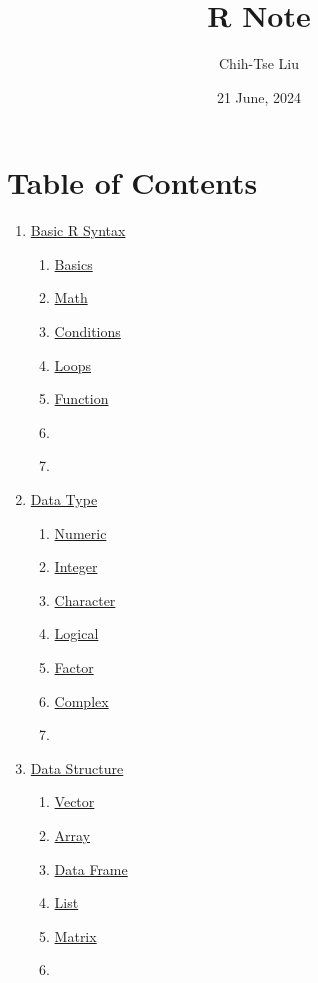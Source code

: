 \documentclass[
  12pt,
]{article}
\title{R Note}
\author{Chih-Tse Liu}
\date{21 June, 2024}
\begin{document}
\maketitle

\section{Table of Contents}
\label{sec:ToC}
\begin{enumerate}
\item \hyperref[sec:BRS]{Basic R Syntax}
  \begin{enumerate}
  \item \hyperref[sec:BRS-basics]{Basics}
  \item \hyperref[sec:BRS-math]{Math}
  \item \hyperref[sec:BRS-conditions]{Conditions}
  \item \hyperref[sec:BRS-loops]{Loops}
  \item \hyperref[sec:BRS-function]{Function}
  \item \hyperref[sec:BRS-]{}
  \item \hyperref[sec:BRS-]{}
  \end{enumerate}
\item \hyperref[sec:VAR]{Data Type}
  \begin{enumerate}
  \item \hyperref[sec:VAR-numeric]{Numeric}
  \item \hyperref[sec:VAR-integer]{Integer}
  \item \hyperref[sec:VAR-character]{Character}
  \item \hyperref[sec:VAR-logical]{Logical}
  \item \hyperref[sec:VAR-factor]{Factor}
  \item \hyperref[sec:VAR-complex]{Complex}
  \item \hyperref[sec:VAR-]{}
  \end{enumerate}
\item \hyperref[sec:DS]{Data Structure}
  \begin{enumerate}
  \item \hyperref[sec:DS-vector]{Vector}
  \item \hyperref[sec:DS-array]{Array}
  \item \hyperref[sec:DS-dataframe]{Data Frame}
  \item \hyperref[sec:DS-list]{List}
  \item \hyperref[sec:DS-matrix]{Matrix}
  \item \hyperref[sec:DS-]{}

\end{enumerate}
\end{enumerate}
\end{document}
